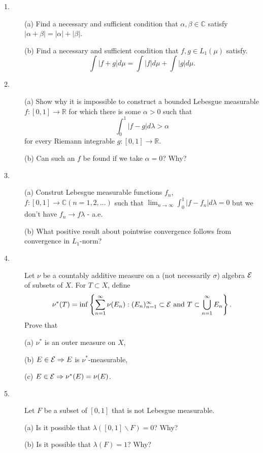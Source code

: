 \documentclass{article}
\def\R{\mathbb R}
\def\C{\mathbb C}
\begin{document}
\begin{description}
\item[1.] (a)
Find a necessary and sufficient condition that $\alpha, \beta \in \C$ satisfy
$|\alpha + \beta| = |\alpha| + |\beta|$.

\item[\quad] (b)
Find a necessary and sufficient condition that $f, g \in L_1 (\mu)$ satisfy.
$$\int |f+g| d\mu = \int |f| d\mu + \int |g| d\mu.$$

\item[2.] (a)
Show why it is impossible to construct a bounded Lebesgue measurable
$f :[0,1] \to \R$ for which there is some $\alpha >0$ such that
$$\int^1_0 |f-g| d \lambda > \alpha$$
for every Riemann integrable $g: [0,1] \to \R$.

\item[\quad] (b)
Can such an $f$ be found if we take $\alpha =0$? Why?

\item[3.] (a)
Construt Lebesgue measurable functions $f_n$, $f:[0,1] \to \C (n=1,2, \dots)$
such that $\lim_{n \to \infty} \int^1_0 |f-f_n| d \lambda = 0$ but we don't
have $f_n \to f \lambda$ - a.e.

\item[\quad] (b)
What positive result about pointwise convergence follows from convergence in
$L_1$-norm?

\item[4.]
Let $\nu$ be a countably additive measure on a (not necessarily $\sigma$)
algebra ${\cal E}$ of subsets of $X$. For $T \subset X$, define
$$\nu^\ast (T) = \inf \left\{\sum^\infty_{n=1} \nu (E_n) : (E_n)^\infty_{n=1}
  \subset {\cal E} \hbox{\ and\ } T \subset \bigcup^\infty_{n=1} E_n
  \right\}.$$
Prove that

\item[\quad] (a)
$\nu^\ast$ is an outer measure on $X$,

\item[\quad] (b)
$E \in {\cal E} \Rightarrow E$ is $\nu^\ast$-measurable,

\item[\quad] (c)
$E \in {\cal E} \Rightarrow \nu^\ast (E) = \nu(E)$.

\item[5.]
Let $F$ be a subset of $[0,1]$ that is not Lebesgue measurable.

\item[\quad] (a)
Is it possible that $\lambda ([0,1] \backslash F) = 0$? Why?

\item[\quad] (b)
Is it possible that $\lambda (F) =1$? Why?


\end{description}
\end{document}
